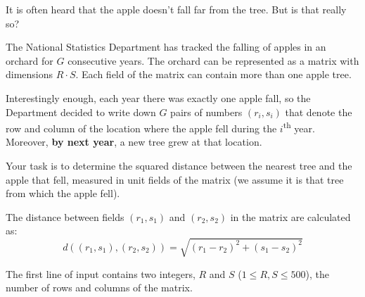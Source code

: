 \renewcommand{\taskname}{JABUKE}
\renewcommand{\timelimit}{2 seconds}
\renewcommand{\memorylimit}{128 MB}
\renewcommand{\score}{140 points}

It is often heard that the apple doesn't fall far from the tree. But is that really so?

The National Statistics Department has tracked the falling of apples in an orchard for $G$ consecutive years. The orchard can be represented as a matrix with dimensions $R \cdot S$. Each field of the matrix can contain more than one apple tree.

Interestingly enough, each year there was exactly one apple fall, so the Department decided to write down $G$ pairs of numbers $(r_i, s_i)$ that denote the row and column of the location where the apple fell during the $i$\textsuperscript{th} year. Moreover, \textbf{by next year}, a new tree grew at that location.

Your task is to determine the squared distance between the nearest tree and the apple that fell, measured in unit fields of the matrix (we assume it is that tree from which the apple fell).

The distance between fields $(r_1, s_1)$ and $(r_2, s_2)$ in the matrix are calculated as:
\[ d((r_1, s_1), (r_2, s_2)) = \sqrt{(r_1-r_2)^2 + (s_1-s_2)^2} \]

\strut


The first line of input contains two integers, $R$ and $S$ ($1 \leqslant R, S \leqslant 500$), the number of rows and columns of the matrix.

